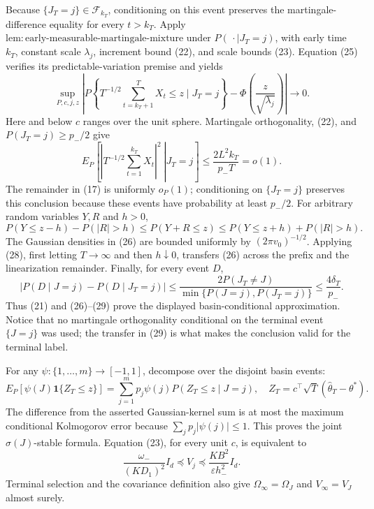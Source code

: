 Because \(\{J_T=j\}\in\mathcal F_{k_T}\), conditioning on this event
preserves the martingale-difference equality for every \(t>k_T\).  Apply
\(\mathrm{lem:early\text{-}measurable\text{-}martingale\text{-}mixture}\)
under \(P(\,\cdot\mid J_T=j)\), with early time \(k_T\), constant scale
\(\lambda_j\), increment bound (22), and scale bounds (23).  Equation (25)
verifies its predictable-variation premise and yields
\[
 \sup_{P,c,j,z}\left|P\!\left\{T^{-1/2}\sum_{t=k_T+1}^TX_t\le z
 \mid J_T=j\right\}
 -\Phi\!\left(\frac z{\sqrt{\lambda_j}}\right)\right|\longrightarrow0.
\tag{26}
\]
Here and below \(c\) ranges over the unit sphere.  Martingale orthogonality,
(22), and \(P(J_T=j)\ge p_-/2\) give
\[
 E_P\!\left[\left.\left|T^{-1/2}\sum_{t=1}^{k_T}X_t\right|^2
 \ \right|J_T=j\right]
 \le\frac{2L^2k_T}{p_-T}=o(1).
\tag{27}
\]
The remainder in (17) is uniformly \(o_P(1)\); conditioning on
\(\{J_T=j\}\) preserves this conclusion because these events have
probability at least \(p_-/2\).  For arbitrary random variables \(Y,R\)
and \(h>0\),
\[
 P(Y\le z-h)-P(|R|>h)\le P(Y+R\le z)
 \le P(Y\le z+h)+P(|R|>h).
\tag{28}
\]
The Gaussian densities in (26) are bounded uniformly by
\((2\pi v_0)^{-1/2}\).  Applying (28), first letting \(T\to\infty\) and
then \(h\downarrow0\), transfers (26) across the prefix and the
linearization remainder.  Finally, for every event \(D\),
\[
 \left|P(D\mid J=j)-P(D\mid J_T=j)\right|
 \le\frac{2P(J_T\ne J)}{\min\{P(J=j),P(J_T=j)\}}
 \le\frac{4\delta_T}{p_-}.
\tag{29}
\]
Thus (21) and (26)--(29) prove the displayed basin-conditional
approximation.  Notice that no martingale orthogonality conditional on the
terminal event \(\{J=j\}\) was used; the transfer in (29) is what makes
the conclusion valid for the terminal label.

For any \(\psi:\{1,\ldots,m\}\to[-1,1]\), decompose over the disjoint basin
events:
\[
 E_P[\psi(J)\mathbf1\{Z_T\le z\}]
 =\sum_{j=1}^mp_j\psi(j)P(Z_T\le z\mid J=j),
 \quad Z_T=c^\top\sqrt T(\widehat\theta_T-\theta^*).
\tag{30}
\]
The difference from the asserted Gaussian-kernel sum is at most the maximum
conditional Kolmogorov error because \(\sum_jp_j|\psi(j)|\le1\).  This
proves the joint \(\sigma(J)\)-stable formula.  Equation (23), for every
unit \(c\), is equivalent to
\[
 \frac{\omega_-}{(KD_1)^2}I_d\preceq V_j
 \preceq\frac{KB^2}{\varepsilon h_-^2}I_d.
\tag{31}
\]
Terminal selection and the covariance definition also give
\(\Omega_\infty=\Omega_J\) and \(V_\infty=V_J\) almost surely.

